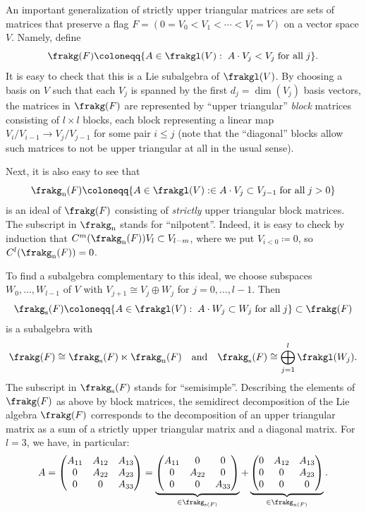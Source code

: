 \begin{example}\label{ex 5.2.20 HN}
    An important generalization of strictly upper triangular matrices are sets of matrices that preserve a flag $F=(0=V_0<V_1<\cdots <V_l=V)$ on a vector space $V$. Namely, define 
    \[\frakg(F)\coloneqq \{A\in\frakgl(V):\; A\cdot V_j<V_j\;\text{for all}\; j\}.\]
    It is easy to check that this is a Lie subalgebra of $\frakgl(V)$. By choosing a basis on $V$ such that each $V_j$ is spanned by the first $d_j=\dim(V_j)$ basis vectors, the matrices in $\frakg(F)$ are represented by ``upper triangular'' \emph{block} matrices consisting of $l\times l$ blocks, each block representing a linear map $V_i\slash V_{i-1}\to V_j\slash V_{j-1}$ for some pair $i\leq j$ (note that the ``diagonal'' blocks allow such matrices to not be upper triangular at all in the usual sense). 
    
    Next, it is also easy to see that 
    \[\frakg_{\mathrm{n}}(F)\coloneqq \{A\in\frakgl(V):\in A\cdot V_j\subset V_{j-1}\;\text{for all}\; j>0\}\]
    is an ideal of $\frakg(F)$ consisting of \emph{strictly} upper triangular block matrices. The subscript in $\frakg_{\mathrm{n}}$ stands for ``nilpotent''. Indeed, it is easy to check by induction that $C^m(\frakg_{\mathrm{n}}(F))V_l\subset V_{l-m}$, where we put $V_{i<0}\coloneqq 0$, so $C^l(\frakg_{\mathrm{n}}(F))=0$. 

    To find a subalgebra complementary to this ideal, we choose subspaces $W_0,\ldots,W_{l-1}$ of $V$ with $V_{j+1}\cong V_j\oplus W_j$ for $j=0,\ldots,l-1$. Then 
    \[\frakg_{\mathrm{s}}(F)\coloneqq \{A\in\frakgl(V):\; A\cdot W_j\subset W_j\;\text{for all}\; j\}\subset\frakg(F)\]
    is a subalgebra with 
    \[\frakg(F)\cong \frakg_{\mathrm{s}}(F)\ltimes\frakg_{\mathrm{n}}(F)\quad \text{and}\quad \frakg_{\mathrm{s}}(F)\cong \bigoplus_{j=1}^l\frakgl(W_j).\]
    The subscript in $\frakg_{\mathrm{s}}(F)$ stands for ``semisimple''. Describing the elements of $\frakg(F)$ as above by block matrices, the semidirect decomposition of the Lie algebra $\frakg(F)$ corresponds to the decomposition of an upper triangular matrix as a sum of a strictly upper triangular matrix and a diagonal matrix. For $l=3$, we have, in particular:
    \[A=\begin{pmatrix}
        A_{11} & A_{12} & A_{13}\\
        0 & A_{22} & A_{23}\\
        0 & 0 & A_{33}
    \end{pmatrix}=
    \underbrace{\begin{pmatrix}
        A_{11} & 0 & 0\\
        0 & A_{22} & 0\\
        0 & 0 & A_{33}\\
    \end{pmatrix}}_{\in\frakg_{\mathrm{s}(F)}}+
    \underbrace{\begin{pmatrix}
        0 & A_{12} & A_{13} \\
        0 & 0 & A_{23}\\
        0 & 0 & 0
    \end{pmatrix}}_{\in\frakg_{\mathrm{n}(F)}}.
    \]
\end{example}

